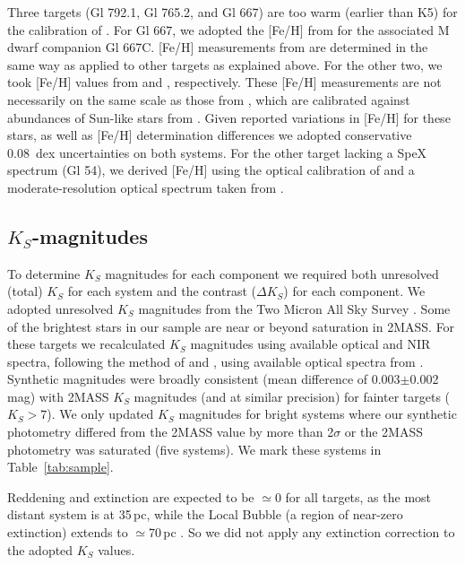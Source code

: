 \documentclass[twocolumn]{aastex62}
\begin{document}
Three targets (Gl 792.1, Gl 765.2, and Gl 667) are too warm (earlier than K5) for the calibration of \citet{Mann2013a}. For Gl 667, we adopted the [Fe/H] from \citet{2014ApJ...791...54G} for the associated M dwarf companion Gl 667C. [Fe/H] measurements from \citet{2014ApJ...791...54G} are determined in the same way as applied to other targets as explained above. For the other two, we took [Fe/H] values from \citet{2011A&A...530A.138C} and \citet{2010A&ARv..18...67T}, respectively. These [Fe/H] measurements are not necessarily on the same scale as those from \citet{Mann2013a}, which are calibrated against abundances of Sun-like stars from \citet{2015ApJ...805..126B,2016ApJS..225...32B}. Given reported variations in [Fe/H] for these stars, as well as [Fe/H] determination differences \citep{2014AJ....148...54H,2016ApJS..226....4H} we adopted conservative 0.08~dex uncertainties on both systems. For the other target lacking a SpeX spectrum (Gl 54), we derived [Fe/H] using the optical calibration of \citet{Mann2013a} and a moderate-resolution optical spectrum taken from \citet{Gaidos2014}.

\subsection{$K_S$-magnitudes}\label{sec:mags}

To determine $K_S$ magnitudes for each component we required both unresolved (total) $K_S$ for each system and the contrast ($\Delta K_S$) for each component. We adopted unresolved $K_S$ magnitudes from the Two Micron All Sky Survey \citep[2MASS,][]{Skrutskie2006}. Some of the brightest stars in our sample are near or beyond saturation in 2MASS. For these targets we recalculated $K_S$ magnitudes using available optical and NIR spectra, following the method of \citet{Mann2015a} and \citet{Mann2015b}, using available optical spectra from \citet{Gaidos2014}. Synthetic magnitudes were broadly consistent (mean difference of 0.003$\pm$0.002\,mag) with 2MASS $K_S$ magnitudes (and at similar precision) for fainter targets ($K_S>7$). We only updated $K_S$ magnitudes for bright systems where our synthetic photometry differed from the 2MASS value by more than 2$\sigma$ or the 2MASS photometry was saturated (five systems). We mark these systems in Table~\ref{tab:sample}. 

Reddening and extinction are expected to be $\simeq$0 for all targets, as the most distant system is at 35\,pc, while the Local Bubble (a region of near-zero extinction) extends to $\simeq$70\,pc \citep{2009MNRAS.397.1286A}. So we did not apply any extinction correction to the adopted $K_S$ values.
\end{document}
